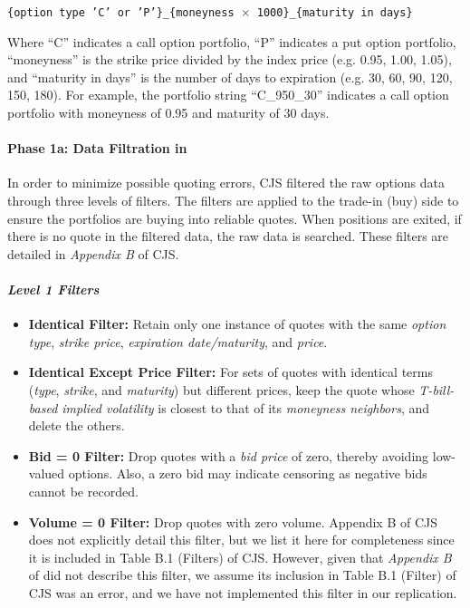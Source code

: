 \documentclass{article}
\begin{document}
\begin{appendices}
\begin{center}
{\texttt{\{option type 'C' or 'P'\}\_\{moneyness $\times$ 1000\}\_\{maturity in days\}}}
\end{center}

Where ``C'' indicates a call option portfolio, ``P'' indicates a put option portfolio, ``moneyness'' is the strike price divided by the index price (e.g. 0.95, 1.00, 1.05), and ``maturity in days'' is the number of days to expiration (e.g. 30, 60, 90, 120, 150, 180). For example, the portfolio string ``C\_950\_30'' indicates a call option portfolio with moneyness of 0.95 and maturity of 30 days.



\paragraph{Phase 1a: Data Filtration in \citet{Constantinides2013}}

In order to minimize possible quoting errors, CJS filtered the raw options data through three levels of filters. The filters are applied to the trade-in (buy) side to ensure the portfolios are buying into reliable quotes. When positions are exited, if there is no quote in the filtered data, the raw data is searched. These filters are detailed in \textit{Appendix B} of CJS.




\paragraph{\textit{Level 1 Filters}}
\begin{itemize}
  \item \textbf{Identical Filter:} Retain only one instance of quotes with the same \textit{option type}, \textit{strike price}, \textit{expiration date/maturity}, and \textit{price}.
  \item \textbf{Identical Except Price Filter:} For sets of quotes with identical terms (\textit{type}, \textit{strike}, and \textit{maturity}) but different prices, keep the quote whose \textit{T-bill-based implied volatility} is closest to that of its \textit{moneyness neighbors}, and delete the others.
  \item \textbf{Bid = 0 Filter:} Drop quotes with a \textit{bid price} of zero, thereby avoiding low-valued options. Also, a zero bid may indicate censoring as negative bids cannot be recorded.
  \item \textbf{Volume = 0 Filter:} Drop quotes with zero volume. Appendix B of CJS does not explicitly detail this filter, but we list it here for completeness since it is included in Table B.1 (Filters) of CJS. However, given that \textit{Appendix B} of \citet{Constantinides2013} did not describe this filter, we assume its inclusion in Table B.1 (Filter) of CJS was an error, and we have not implemented this filter in our replication.
\end{itemize}



\end{appendices}
\end{document}
